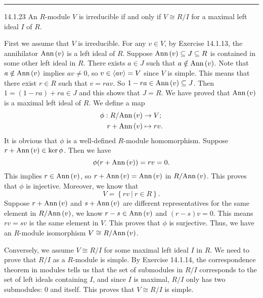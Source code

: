 \documentclass[a4paper, 12pt]{article}
\begin{document}
\noindent\rule{7in}{2.8pt}
\begin{problem}{14.1.23}
An \(R\)-module \(V\) is irreducible if and only if \(V\cong R/I\) for a maximal left ideal \(I\) of \(R\).
\end{problem}
\begin{solution}
First we assume that \(V\) is irreducible. For any \(v\in V\), by Exercise 14.1.13, the annihilator \(\text{Ann}\,(v)\) is a left ideal of \(R\). Suppose \(\text{Ann}\,(v)\subseteq J\subseteq R\) is contained in some other left ideal in \(R\). There exists \(a\in J\) such that \(a\notin \text{Ann}\,(v)\). Note that 
\(a\notin \text{Ann}\,(v)\) implies \(av\neq 0\), so \(v\in \langle av\rangle =V\) since \(V\) is simple. This means that there exist \(r\in R\) such that \(v=rav\). So \(1-ra\in \text{Ann}\,(v)\subseteq J\). Then \(1=(1-ra)+ra\in J\) and this shows that \(J=R\). We have proved that \(\text{Ann}\,(v)\) is a maximal left ideal of 
\(R\). We define a map 
\begin{align*}
    \phi:R/\text{Ann}\,(v)&\rightarrow V;\\ 
       r+\text{Ann}\,(v)&\mapsto rv.
\end{align*}
It is obvious that \(\phi\) is a well-defined \(R\)-module homomorphism. Suppose \(r+\text{Ann}\,(v)\in \ker \phi\). Then we have 
\[\phi(r+\text{Ann}\,(v))=rv=0.\]
This implies \(r\in \text{Ann}\,(v)\), so \(r+\text{Ann}\,(v)=\text{Ann}\,(v)\) in \(R/\text{Ann}\,(v)\). This proves that \(\phi\) is injective. Moreover, we know that 
\[V=\left\{ rv\ |\ r\in R \right\}.\]
Suppose \(r+\text{Ann}\,(v)\) and \(s+\text{Ann}\,(v)\) are different representatives for the same element in \(R/\text{Ann}\,(v)\), we know \(r-s\in \text{Ann}\,(v)\) and \((r-s)v=0\). This means \(rv=sv\) is the same element in \(V\). This proves that 
\(\phi\) is surjective. Thus, we have an \(R\)-module isomorphism \(V\cong R/\text{Ann}\,(v)\). 

Conversely, we assume \(V\cong R/I\) for some maximal left ideal \(I\) in \(R\). We need to prove that \(R/I\) as a \(R\)-module is simple. By Exercise 14.1.14, the correspondence theorem in modules tells us that the set of submodules in \(R/I\) corresponds to the set of left ideals containing \(I\), and 
since \(I\) is maximal, \(R/I\) only has two submodules: \(0\) and itself. This proves that \(V\cong R/I\) is simple.
\end{solution}
\end{document}
